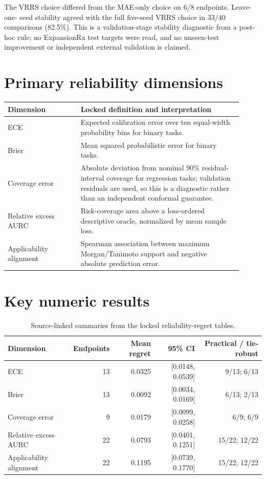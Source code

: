 \documentclass[11pt]{article}
\begin{document}
The VRRS choice differed from the MAE-only choice on 6/8 endpoints. Leave-one-
seed stability agreed with the full five-seed VRRS choice in 33/40 comparisons
(82.5\%). This is a validation-stage stability diagnostic from a post-hoc rule;
no ExpansionRx test targets were read, and no unseen-test improvement or
independent external validation is claimed.

\section{Primary reliability dimensions}
\begin{longtable}{p{0.29\linewidth}p{0.62\linewidth}}
\toprule
Dimension & Locked definition and interpretation \\
\midrule
ECE & Expected calibration error over ten equal-width probability bins for binary tasks. \\
Brier & Mean squared probabilistic error for binary tasks. \\
Coverage error & Absolute deviation from nominal 90\% residual-interval coverage for regression tasks; validation residuals are used, so this is a diagnostic rather than an independent conformal guarantee. \\
Relative excess AURC & Risk-coverage area above a loss-ordered descriptive oracle, normalized by mean sample loss. \\
Applicability alignment & Spearman association between maximum Morgan/Tanimoto support and negative absolute prediction error. \\
\bottomrule
\end{longtable}

\section{Key numeric results}
\begin{table}[ht]
\centering
\begin{tabular}{lrrrr}
\toprule
Dimension & Endpoints & Mean regret & 95\% CI & Practical / tie-robust \\
\midrule
ECE & 13 & 0.0325 & [0.0148, 0.0539] & 9/13; 6/13 \\
Brier & 13 & 0.0092 & [0.0034, 0.0169] & 6/13; 2/13 \\
Coverage error & 9 & 0.0179 & [0.0099, 0.0258] & 6/9; 6/9 \\
Relative excess AURC & 22 & 0.0793 & [0.0401, 0.1251] & 15/22; 12/22 \\
Applicability alignment & 22 & 0.1195 & [0.0739, 0.1770] & 15/22; 12/22 \\
\bottomrule
\end{tabular}
\caption{Source-linked summaries from the locked reliability-regret tables.}
\end{table}
\end{document}
